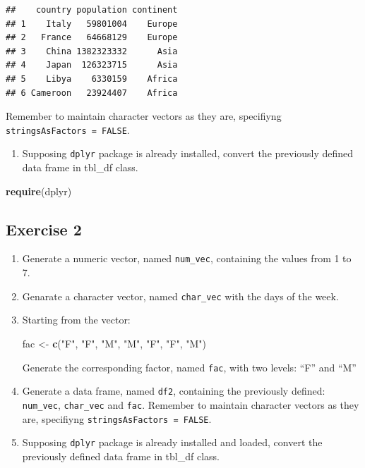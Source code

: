 \documentclass[]{book}
\newenvironment{Shaded}{\begin{snugshade}}{\end{snugshade}}
\newcommand{\KeywordTok}[1]{\textcolor[rgb]{0.13,0.29,0.53}{\textbf{{#1}}}}
\newcommand{\StringTok}[1]{\textcolor[rgb]{0.31,0.60,0.02}{{#1}}}
\newcommand{\NormalTok}[1]{{#1}}
\providecommand{\tightlist}{%
  \setlength{\itemsep}{0pt}\setlength{\parskip}{0pt}}
\def\tightlist{}
\begin{document}
\begin{verbatim}
##    country population continent
## 1    Italy   59801004    Europe
## 2   France   64668129    Europe
## 3    China 1382323332      Asia
## 4    Japan  126323715      Asia
## 5    Libya    6330159    Africa
## 6 Cameroon   23924407    Africa
\end{verbatim}

Remember to maintain character vectors as they are, specifiyng
\texttt{stringsAsFactors\ =\ FALSE}.

\begin{enumerate}
\def\labelenumi{\alph{enumi}.}
\setcounter{enumi}{1}
\tightlist
\item
  Supposing \texttt{dplyr} package is already installed, convert the
  previously defined data frame in tbl\_df class.
\end{enumerate}

\begin{Shaded}
\begin{Highlighting}[]
\KeywordTok{require}\NormalTok{(dplyr)}
\end{Highlighting}
\end{Shaded}

\subsection{Exercise 2}\label{exercise-2-1}

\begin{enumerate}
\def\labelenumi{\alph{enumi}.}
\item
  Generate a numeric vector, named \texttt{num\_vec}, containing the
  values from 1 to 7.
\item
  Genarate a character vector, named \texttt{char\_vec} with the days of
  the week.
\item
  Starting from the vector:

\begin{Shaded}
\begin{Highlighting}[]
\NormalTok{fac <-}\StringTok{ }\KeywordTok{c}\NormalTok{(}\StringTok{"F"}\NormalTok{, }\StringTok{"F"}\NormalTok{, }\StringTok{"M"}\NormalTok{, }\StringTok{"M"}\NormalTok{, }\StringTok{"F"}\NormalTok{, }\StringTok{"F"}\NormalTok{, }\StringTok{"M"}\NormalTok{)}
\end{Highlighting}
\end{Shaded}

  Generate the corresponding factor, named \texttt{fac}, with two
  levels: ``F'' and ``M''
\item
  Generate a data frame, named \texttt{df2}, containing the previously
  defined: \texttt{num\_vec}, \texttt{char\_vec} and \texttt{fac}.
  Remember to maintain character vectors as they are, specifiyng
  \texttt{stringsAsFactors\ =\ FALSE}.
\item
  Supposing \texttt{dplyr} package is already installed and loaded,
  convert the previously defined data frame in tbl\_df class.
\end{enumerate}
\end{document}
